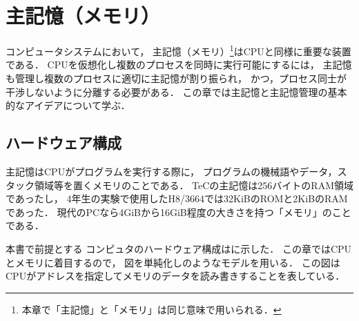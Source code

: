 \chapter{主記憶（メモリ）}
コンピュータシステムにおいて，
主記憶（メモリ）\footnote{
  本章で「主記憶」と「メモリ」は同じ意味で用いられる．
}はCPUと同様に重要な装置である．
CPUを仮想化し複数のプロセスを同時に実行可能にするには，
主記憶も管理し複数のプロセスに適切に主記憶が割り振られ，
かつ，プロセス同士が干渉しないように分離する必要がある．
この章では主記憶と主記憶管理の基本的なアイデアについて学ぶ．

\section{ハードウェア構成}
主記憶はCPUがプログラムを実行する際に，
プログラムの機械語やデータ，スタック領域等を置くメモリのことである．
TeCの主記憶は256バイトのRAM領域であったし，
4年生の実験で使用したH8/3664では32KiBのROMと2KiBのRAMであった．
現代のPCなら4GiBから16GiB程度の大きさを持つ「メモリ」のことである．

本書で前提とする
コンピュタのハードウェア構成はに示した．
この章ではCPUとメモリに着目するので，
図を単純化しのようなモデルを用いる．
この図はCPUがアドレスを指定してメモリのデータを読み書きすることを表している．

